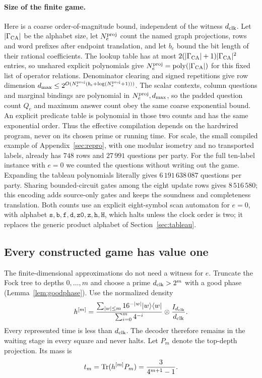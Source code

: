 \paragraph{Size of the finite game.}
Here is a coarse order-of-magnitude bound, independent of the witness ${d_{\rm clk}}$. Let $|\Gamma_{\rm CA}|$ be the alphabet size, let $N^{\rm proj}_e$ count the named graph projections, rows and word prefixes after endpoint translation, and let $b_e$ bound the bit length of their rational coefficients. The lookup table has at most $2(|\Gamma_{\rm CA}|+1)|\Gamma_{\rm CA}|^2$ entries, so unshared explicit polynomials give $N^{\rm proj}_e=\operatorname{poly}(|\Gamma_{\rm CA}|)$ for this fixed list of operator relations. Denominator clearing and signed repetitions give row dimension $d_{\max}\leq2^{O(N^{\rm proj}_e(b_e+\log(N^{\rm proj}_e+1)))}$. The scalar contexts, column questions and marginal bindings are polynomial in $N^{\rm proj}_e,d_{\max}$, so the padded question count $Q_e$ and maximum answer count obey the same coarse exponential bound. An explicit predicate table is polynomial in those two counts and has the same exponential order. Thus the effective compilation depends on the hardwired program, never on its chosen prime or running time. For scale, the small compiled example of Appendix~\ref{sec:repro}, with one modular isometry and no transported labels, already has $748$ rows and $27\,991$ questions per party. For the full ten-label instance with $e=0$ we counted the questions without writing out the game. Expanding the tableau polynomials literally gives $6\,191\,638\,087$ questions per party. Sharing bounded-circuit gates among the eight update rows gives $8\,516\,580$; this encoding adds source-only gates and keeps the soundness and completeness translation. Both counts use an explicit eight-symbol scan automaton for $e=0$, with alphabet $\mathtt s,\mathtt b,\mathtt f,\mathtt d,\mathtt{z0},\mathtt z,\mathtt h,\mathtt H$, which halts unless the clock order is two; it replaces the generic product alphabet of Section~\ref{sec:tableau}.

\subsection{Every constructed game has value one}\label{sec:value}
The finite-dimensional approximations do not need a witness for $e$. Truncate the Fock tree to depths $0,\ldots,m$ and choose a prime ${d_{\rm clk}}>2^m$ with a good phase (Lemma~\ref{lem:goodphase}). Use the normalized density
\[
 h^{[m]}=\frac{\sum_{|w|\leq m}16^{-|w|}|w\rangle\langle w|}
 {\sum_{i=0}^m4^{-i}}\otimes\frac{I_{d_{\rm clk}}}{{d_{\rm clk}}}.
\]
Every represented time is less than ${d_{\rm clk}}$. The decoder therefore remains in the waiting stage in every square and never halts. Let $P_m$ denote the top-depth projection. Its mass is
\begin{equation}\label{eq:topmass}
 t_m=\operatorname{Tr}(h^{[m]}P_m)=\frac{3}{4^{m+1}-1}.
\end{equation}

